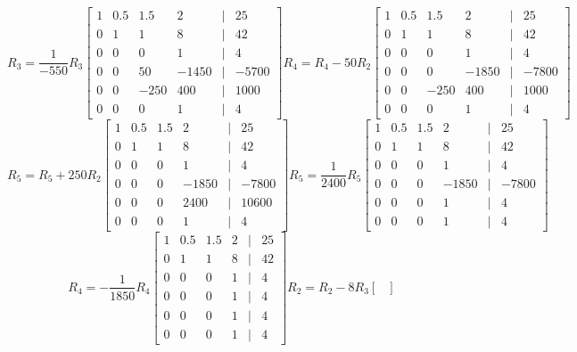 \documentclass[11pt]{article}
\begin{document}
\begin{enumerate}
\begin{enumerate}
\[
R_3 = \frac{1}{-550}R_3
\begin{bmatrix}
    1 & 0.5 & 1.5 & 2 &|& 25 \\
    0 & 1 & 1 & 8 &|& 42 \\
    0 & 0 & 0 & 1 &|& 4 \\
    0 & 0 & 50 & -1450 &|& -5700 \\
    0 & 0 & -250 & 400 &|& 1000\\
    0 & 0 & 0 & 1 &|& 4
\end{bmatrix}
R_4 = R_4 - 50R_2
\begin{bmatrix}
    1 & 0.5 & 1.5 & 2 &|& 25 \\
    0 & 1 & 1 & 8 &|& 42 \\
    0 & 0 & 0 & 1 &|& 4 \\
    0 & 0 & 0 & -1850 &|& -7800 \\
    0 & 0 & -250 & 400 &|& 1000\\
    0 & 0 & 0 & 1 &|& 4
\end{bmatrix}
\]
\[
R_5 = R_5 + 250R_2
\begin{bmatrix}
    1 & 0.5 & 1.5 & 2 &|& 25 \\
    0 & 1 & 1 & 8 &|& 42 \\
    0 & 0 & 0 & 1 &|& 4 \\
    0 & 0 & 0 & -1850 &|& -7800 \\
    0 & 0 & 0 & 2400 &|& 10600\\
    0 & 0 & 0 & 1 &|& 4
\end{bmatrix}
R_5 = \frac{1}{2400}R_5
\begin{bmatrix}
    1 & 0.5 & 1.5 & 2 &|& 25 \\
    0 & 1 & 1 & 8 &|& 42 \\
    0 & 0 & 0 & 1 &|& 4 \\
    0 & 0 & 0 & -1850 &|& -7800 \\
    0 & 0 & 0 & 1 &|& 4 \\
    0 & 0 & 0 & 1 &|& 4
\end{bmatrix}
\]
\[
R_4 = -\frac{1}{1850}R_4
\begin{bmatrix}
    1 & 0.5 & 1.5 & 2 &|& 25 \\
    0 & 1 & 1 & 8 &|& 42\\
    0 & 0 & 0 & 1 &|& 4 \\
    0 & 0 & 0 & 1 &|& 4 \\
    0 & 0 & 0 & 1 &|& 4 \\
    0 & 0 & 0 & 1 &|& 4
\end{bmatrix}
R_2 = R_2 - 8R_3
\begin{bmatrix}

\end{bmatrix}\]
\end{enumerate}
\end{enumerate}
\end{document}
